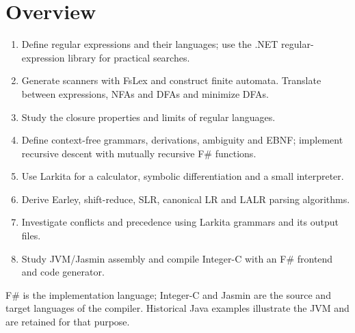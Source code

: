 \section{Overview}
\begin{enumerate}
\item Define regular expressions and their languages; use the .NET regular-expression library for practical searches.
\item Generate scanners with FsLex and construct finite automata.
Translate between expressions, NFAs and DFAs and minimize DFAs.
\item Study the closure properties and limits of regular languages.
\item Define context-free grammars, derivations, ambiguity and EBNF; implement recursive descent with mutually recursive F\# functions.
\item Use Larkita for a calculator, symbolic differentiation and a small interpreter.
\item Derive Earley, shift-reduce, SLR, canonical LR and LALR parsing algorithms.
\item Investigate conflicts and precedence using Larkita grammars and its output files.
\item Study JVM/Jasmin assembly and compile Integer-C with an F\# frontend and code generator.
\end{enumerate}
F\# is the implementation language; Integer-C and Jasmin are the source and target languages of the compiler.
Historical Java examples illustrate the JVM and are retained for that purpose.
